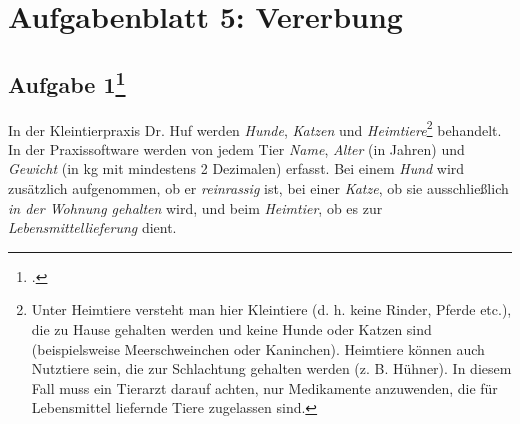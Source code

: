 \documentclass{lehramt-informatik-haupt}
\begin{document}
\chapter{Aufgabenblatt 5: Vererbung}

%

\section{Aufgabe 1\footcite{oomup:ab:5}}

In der Kleintierpraxis Dr. Huf werden \emph{Hunde}, \emph{Katzen} und
\emph{Heimtiere}\footnote{Unter Heimtiere versteht man hier Kleintiere
(d. h. keine Rinder, Pferde etc.), die zu Hause gehalten werden und
keine Hunde oder Katzen sind (beispielsweise Meerschweinchen oder
Kaninchen). Heimtiere können auch Nutztiere sein, die zur Schlachtung
gehalten werden (z. B. Hühner). In diesem Fall muss ein Tierarzt darauf
achten, nur Medikamente anzuwenden, die für Lebensmittel liefernde Tiere
zugelassen sind.} behandelt. In der Praxissoftware werden von jedem Tier
\emph{Name}, \emph{Alter} (in Jahren) und \emph{Gewicht} (in kg mit
mindestens 2 Dezimalen) erfasst. Bei einem \emph{Hund} wird zusätzlich
aufgenommen, ob er \emph{reinrassig} ist, bei einer \emph{Katze}, ob sie
ausschließlich \emph{in der Wohnung gehalten} wird, und beim
\emph{Heimtier}, ob es zur \emph{Lebensmittellieferung} dient.
\end{document}
